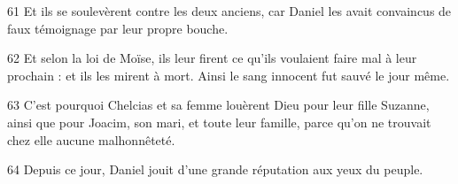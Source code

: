 \par 61 Et ils se soulevèrent contre les deux anciens, car Daniel les avait convaincus de faux témoignage par leur propre bouche.
\par 62 Et selon la loi de Moïse, ils leur firent ce qu'ils voulaient faire mal à leur prochain : et ils les mirent à mort. Ainsi le sang innocent fut sauvé le jour même.
\par 63 C'est pourquoi Chelcias et sa femme louèrent Dieu pour leur fille Suzanne, ainsi que pour Joacim, son mari, et toute leur famille, parce qu'on ne trouvait chez elle aucune malhonnêteté.
\par 64 Depuis ce jour, Daniel jouit d'une grande réputation aux yeux du peuple.

